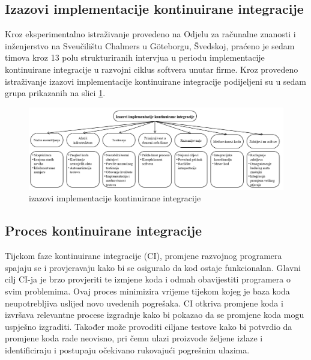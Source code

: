 \documentclass[a4paper,12pt,oneside]{article}
\begin{document}
\subsection{Izazovi implementacije kontinuirane integracije}
Kroz eksperimentalno istraživanje provedeno na Odjelu za računalne znanosti i inženjerstvo na Sveučilištu Chalmers u Göteborgu, Švedskoj, praćeno je sedam timova kroz 13 polu strukturiranih intervjua u periodu implementacije kontinuirane integracije u razvojni ciklus softvera unutar firme. Kroz provedeno istraživanje izazovi implementacije kontinuirane integracije podijeljeni su u sedam grupa prikazanih na slici \ref{f:izazovi implementacije kontinuirane integracije}.


\begin{figure}[ht!] %
	\centering %
	\includegraphics[scale=0.44]{./Slike/izazovi implementacije kontinuirane integracije.png} %
	\caption{izazovi implementacije kontinuirane integracije \cite{challenges} \label{f:izazovi implementacije kontinuirane integracije}} %
\end{figure}

\subsection{Proces kontinuirane integracije}
Tijekom faze kontinuirane integracije (CI), promjene razvojnog programera spajaju se i provjeravaju kako bi se osiguralo da kod ostaje funkcionalan. Glavni cilj CI-ja je brzo provjeriti te izmjene koda i odmah obavijestiti programera o svim problemima. Ovaj proces minimizira vrijeme tijekom kojeg je baza koda neupotrebljiva uslijed novo uvedenih pogrešaka. CI otkriva promjene koda i izvršava relevantne procese izgradnje kako bi pokazao da se promjene koda mogu uspješno izgraditi. Također može provoditi ciljane testove kako bi potvrdio da promjene koda rade neovisno, pri čemu ulazi proizvode željene izlaze i identificiraju i postupaju očekivano rukovajući pogrešnim ulazima.
\end{document}
